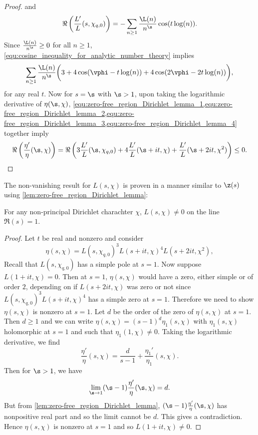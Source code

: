 \begin{proof}
        and
        \begin{equation}\label{equ:zero-free_region_Dirichlet_lemma_3}
          \Re\left(\frac{L'}{L}(s,\chi_{q,0})\right) = -\sum_{n \ge 1}\frac{\L(n)}{n^{\s}}\cos(t\log(n)).
        \end{equation}
        Since $\frac{\L(n)}{n^{\s}} \ge 0$ for all $n \ge 1$, \cref{equ:cosine_inequality_for_analytic_number_theory} implies
        \begin{equation}\label{equ:zero-free_region_Dirichlet_lemma_4}
          \sum_{n \ge 1}\frac{\L(n)}{n^{\s}}\bigg(3+4\cos(\vphi-t\log(n))+4\cos(2\vphi-2t\log(n))\bigg),
        \end{equation}
        for any real $t$. Now for $s = \s$ with $\s > 1$, upon taking the logarithmic derivative of $\eta(\s,\chi)$, \cref{equ:zero-free_region_Dirichlet_lemma_1,equ:zero-free_region_Dirichlet_lemma_2,equ:zero-free_region_Dirichlet_lemma_3,equ:zero-free_region_Dirichlet_lemma_4} together imply
        \[
          \Re\left(\frac{\eta'}{\eta}(\s,\chi)\right) = \Re\left(3\frac{L'}{L}(\s,\chi_{q,0})+4\frac{L'}{L}(\s+it,\chi)+\frac{L'}{L}(\s+2it,\chi^{2})\right) \le 0.
        \]
      \end{proof}

      The non-vanishing result for $L(s,\chi)$ is proven in a manner similar to $\z(s)$ using \cref{lem:zero-free_region_Dirichlet_lemma}:

      \begin{theorem}\label{thm:non-vanishing_of_Dirichlet_on_Re(s)=1}
        For any non-principal Dirichlet charachter $\chi$, $L(s,\chi) \neq 0$ on the line $\Re(s) = 1$.
      \end{theorem}
      \begin{proof}
        Let $t$ be real and nonzero and consider
        \[
          \eta(s,\chi) = L(s,\chi_{q,0})^{3}L(s+it,\chi)^{4}L(s+2it,\chi^{2}),
        \]
        Recall that $L(s,\chi_{q,0})$ has a simple pole at $s = 1$. Now suppose $L(1+it,\chi) = 0$. Then at $s = 1$, $\eta(s,\chi)$ would have a zero, either simple or of order $2$, depending on if $L(s+2it,\chi)$ was zero or not since $L(s,\chi_{q,0})^{3}L(s+it,\chi)^{4}$ has a simple zero at $s = 1$. Therefore we need to show $\eta(s,\chi)$ is nonzero at $s = 1$. Let $d$ be the order of the zero of $\eta(s,\chi)$ at $s = 1$. Then $d \ge 1$ and we can write $\eta(s,\chi) = (s-1)^{d}\eta_{1}(s,\chi)$ with $\eta_{1}(s,\chi)$ holomorphic at $s = 1$ and such that $\eta_{1}(1,\chi) \neq 0$. Taking the logarithmic derivative, we find
        \[
          \frac{\eta'}{\eta}(s,\chi) = \frac{d}{s-1}+\frac{\eta_{1}'}{\eta_{1}}(s,\chi).
        \]
        Then for $\s > 1$, we have
        \[
          \lim_{\s \to 1}(\s-1)\frac{\eta'}{\eta}(\s,\chi) = d.
        \]
        But from \cref{lem:zero-free_region_Dirichlet_lemma}, $(\s-1)\frac{\eta'}{\eta}(\s,\chi)$ has nonpositive real part and so the limit cannot be $d$. This gives a contradiction. Hence $\eta(s,\chi)$ is nonzero at $s = 1$ and so $L(1+it,\chi) \neq 0$.
      \end{proof}
